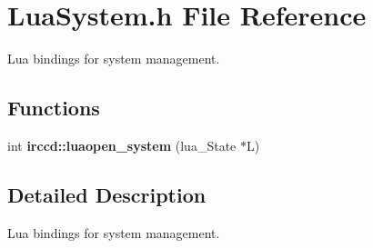 \hypertarget{a00107}{\section{Lua\-System.\-h File Reference}
\label{a00107}
}


Lua bindings for system management.  


\subsection*{Functions}
\begin{DoxyCompactItemize}
\item 
int {\bfseries irccd\-::luaopen\-\_\-system} (lua\-\_\-\-State $\ast$L)
\end{DoxyCompactItemize}


\subsection{Detailed Description}
Lua bindings for system management. 